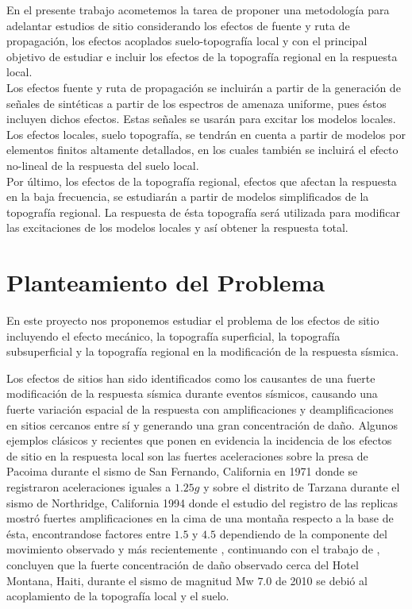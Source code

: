 \documentclass[spanish,letterpaper,12pt,twoside,openany]{article}
\begin{document}
%
En el presente trabajo acometemos la tarea de proponer una metodología para adelantar estudios de sitio considerando los efectos de fuente y ruta de propagación, los efectos acoplados suelo-topografía local y con el principal objetivo de estudiar e incluir los efectos de la topografía regional en la respuesta local.\\
%
Los efectos fuente y ruta de propagación se incluirán a partir de la generación de señales de sintéticas a partir de los espectros de amenaza uniforme, pues éstos incluyen dichos efectos. Estas señales se usarán para excitar los modelos locales.\\
%
Los efectos locales, suelo topografía, se tendrán en cuenta a partir de modelos por elementos finitos altamente detallados, en los cuales también se incluirá el efecto no-lineal de la respuesta del suelo local.\\
%
Por último, los efectos de la topografía regional, efectos que afectan la respuesta en la baja frecuencia, se estudiarán a partir de modelos simplificados de la topografía regional. La respuesta de ésta topografía será utilizada para modificar las excitaciones de los modelos locales y así obtener la respuesta total.
%
%
%
%
%
\section{Planteamiento del Problema}
%
En este proyecto nos proponemos estudiar el problema de los efectos de sitio incluyendo el efecto mecánico, la topografía superficial, la topografía subsuperficial y la topografía regional en la modificación de la respuesta sísmica.

Los efectos de sitios han sido identificados como los causantes de una fuerte modificación de la respuesta sísmica durante eventos sísmicos, causando una fuerte variación espacial de la respuesta con amplificaciones y deamplificaciones en sitios cercanos entre sí y generando una gran concentración de daño. Algunos ejemplos clásicos y recientes que ponen en evidencia la incidencia de los efectos de sitio en la respuesta local son las fuertes aceleraciones sobre la presa de Pacoima durante el sismo de San Fernando, California en 1971 \citep{trifunac1971analysis} donde se registraron aceleraciones iguales a $1.25g$ y sobre el distrito de Tarzana durante el sismo de Northridge, California 1994 \citep{spudich1996directional} donde el estudio del registro de las replicas mostró fuertes amplificaciones en la cima de una montaña respecto a la base de ésta, encontrandose factores entre $1.5$ y $4.5$ dependiendo de la componente del movimiento observado y más recientemente \citep{Assimaki2013}, continuando con el trabajo de \citep{Hough2011}, concluyen que la fuerte concentración de daño observado cerca del Hotel Montana, Haiti, durante el sismo de magnitud Mw $7.0$ de 2010 se debió al acoplamiento de la topografía local y el suelo.
\end{document}
